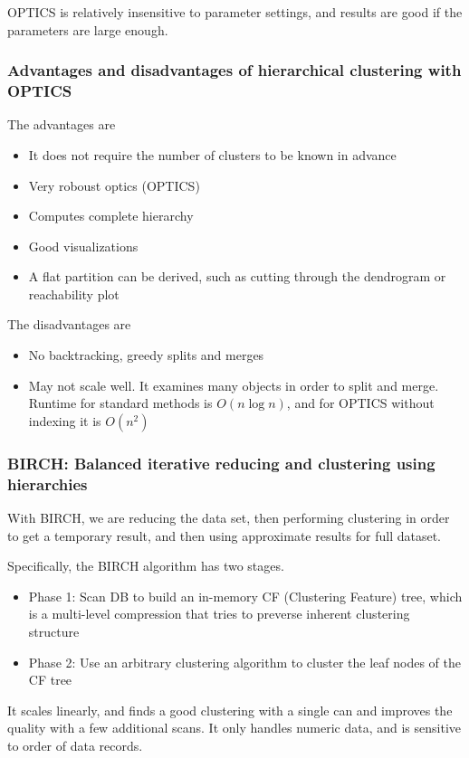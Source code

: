 OPTICS is relatively insensitive to parameter settings, and results are good if the parameters are large enough.

\subsubsection{Advantages and disadvantages of hierarchical clustering with OPTICS}
The advantages are

\begin{itemize}
    \item It does not require the number of clusters to be known in advance
    \item Very roboust optics (OPTICS)
    \item Computes complete hierarchy
    \item Good visualizations
    \item A flat partition can be derived, such as cutting through the dendrogram or reachability plot
\end{itemize}

The disadvantages are
\begin{itemize}
    \item No backtracking, greedy splits and merges
    \item May not scale well. It examines many objects in order to split and merge. Runtime for standard methods is $O(n \log n)$, and for OPTICS without indexing it is $O(n^2)$
\end{itemize}

\subsubsection{BIRCH: Balanced iterative reducing and clustering using hierarchies}
With BIRCH, we are reducing the data set, then performing clustering in order to get a temporary result, and then using approximate results for full dataset. 

Specifically, the BIRCH algorithm has two stages.
\begin{itemize}
    \item Phase 1: Scan DB to build an in-memory CF (Clustering Feature) tree, which is a multi-level compression that tries to preverse inherent clustering structure
    \item Phase 2: Use an arbitrary clustering algorithm to cluster the leaf nodes of the CF tree
\end{itemize}
It scales linearly, and finds a good clustering with a single can and improves the quality with a few additional scans. It only handles numeric data, and is sensitive to order of data records.

